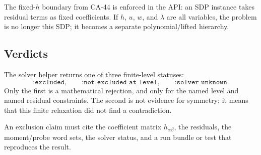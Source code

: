 The fixed-\(h\) boundary from CA-44 is enforced in the API: an SDP instance
takes residual terms as fixed coefficients.  If \(h\), \(u\), \(w\), and
\(\lambda\) are all variables, the problem is no longer this SDP; it becomes a
separate polynomial/lifted hierarchy.

\subsection{Verdicts}

The solver helper returns one of three finite-level statuses:
\[
  \texttt{:excluded},\qquad
  \texttt{:not\_excluded\_at\_level},\qquad
  \texttt{:solver\_unknown}.
\]
Only the first is a mathematical rejection, and only for the named level and
named residual constraints.  The second is not evidence for symmetry; it means
that this finite relaxation did not find a contradiction.

An exclusion claim must cite the coefficient matrix \(h_{\alpha\beta}\), the
residuals, the moment/probe word sets, the solver status, and a run bundle or
test that reproduces the result.
